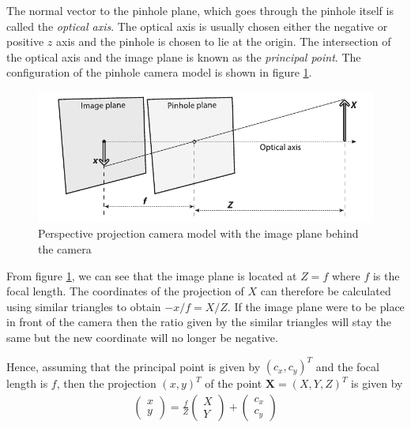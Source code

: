 \documentclass[11pt,a4paper]{report}
\begin{document}
The normal vector to the pinhole plane, which goes through the pinhole itself is
called the \textit{optical axis}. The optical axis is usually chosen either the
negative or positive $z$ axis and the pinhole is chosen to lie at the origin. The intersection of the optical axis and the
image plane is known as the \textit{principal point}. The configuration of the
pinhole camera model is shown in figure \ref{fg:pin}.
\begin{figure}[H] 
\centering
\includegraphics[scale=0.75]{images/pinhole.png}
\caption{Perspective projection camera model with the image plane behind the camera}
\label{fg:pin}
\end{figure}

From figure \ref{fg:pin}, we can see that the image plane is located at $Z=f$
where $f$ is the focal length. The coordinates of the projection of $X$ can
therefore be calculated using similar triangles to obtain $-x/f = X/Z$.
If the image plane were to be place in front of the camera then the ratio given
by the similar triangles will stay the same but the new coordinate will no
longer be negative.

Hence, assuming that the principal point is given by $(c_x,c_y)^T$ and the focal
length is $f$, then the projection $(x,y)^T$ of the point $\mathbf{X} = (X,Y,Z)^T$ is given by
\begin{align}\label{eq:pinCoord}
\begin{pmatrix}x\\y\end{pmatrix} = \frac{f}{Z}\begin{pmatrix}X\\Y\end{pmatrix} + \begin{pmatrix}c_x\\c_y\end{pmatrix}
\end{align}
\end{document}
